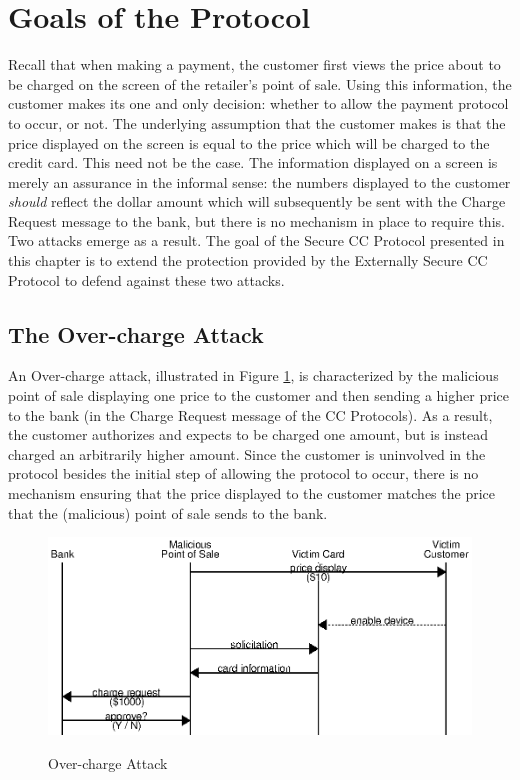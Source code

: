 \section{Goals of the Protocol}
\label{sec:secure-goals}

Recall that when making a payment, the customer first views the price about to be charged on the screen of the retailer's point of sale.
Using this information, the customer makes its one and only decision: whether to allow the payment protocol to occur, or not.
The underlying assumption that the customer makes is that the price displayed on the screen is equal to the price which will be charged to the credit card.
This need not be the case.
The information displayed on a screen is merely an assurance in the informal sense:
    the numbers displayed to the customer \emph{should} reflect the dollar amount which will subsequently be sent with the Charge Request message to the bank,
    but there is no mechanism in place to require this.
Two attacks emerge as a result.
The goal of the Secure CC Protocol presented in this chapter is to extend the protection provided by the Externally Secure CC Protocol to defend against these two attacks.

\subsection{The Over-charge Attack}
\label{sec:overcharge}
An Over-charge attack, illustrated in Figure \ref{fig:attack_overcharge}, is characterized by the malicious point of sale displaying one price to the customer
	and then sending a higher price to the bank
	(in the Charge Request message of the CC Protocols).
As a result, the customer authorizes and expects to be charged one amount, but is instead charged an arbitrarily higher amount.
Since the customer is uninvolved in the protocol besides the initial step of allowing the protocol to occur,
	there is no mechanism ensuring that the price displayed to the customer matches the price that the (malicious) point of sale sends to the bank.

\begin{figure}
  \caption{Over-charge Attack}
  \centering
    \includegraphics{img/attack-mr-overcharge.eps}
  \label{fig:attack_overcharge}
\end{figure}

